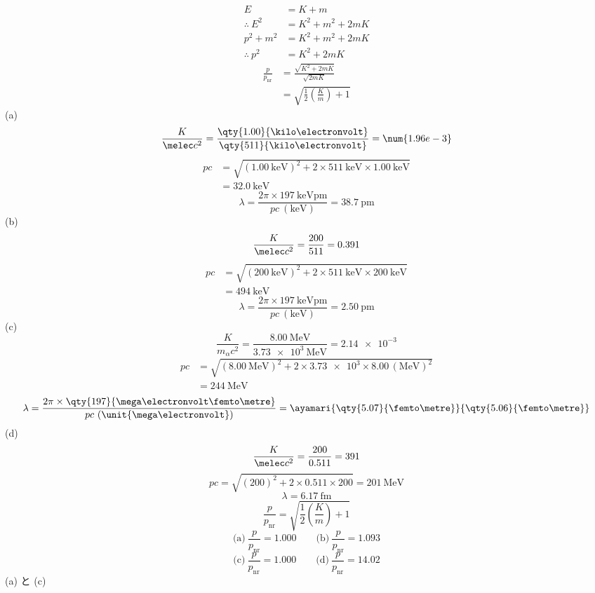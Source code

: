 \begin{align*}
  E&=K+m\\
  \therefore\ E^{2}&=K^{2}+m^{2}+2mK\\
  p^{2}+m^{2}&=K^{2}+m^{2}+2mK\\
  \therefore\ p^{2}&=K^{2}+2mK
\end{align*}
\begin{align*}
  \frac{p}{p_{\mathrm{nr}}}&=\frac{\sqrt{K^{2}+2mK}}{\sqrt{2mK}}\\
  &=\sqrt{\frac{1}{2}\left(\frac{K}{m}\right)+1}
\end{align*}
(a)
\[ \frac{K}{\melec c^{2}}=\frac{\qty{1.00}{\kilo\electronvolt}}{\qty{511}{\kilo\electronvolt}}=\num{1.96e-3} \]
\begin{align*}
  pc&=\sqrt{(\qty{1.00}{\kilo\electronvolt})^{2}+2\times\qty{511}{\kilo\electronvolt}\times\qty{1.00}{\kilo\electronvolt}}\\
  &=\qty{32.0}{\kilo\electronvolt}
\end{align*}
\[ \lambda=\frac{2\pi\times\qty{197}{\kilo\electronvolt\pico\metre}}{pc\ (\unit{\kilo\electronvolt})}=\qty{38.7}{\pico\metre} \]
(b)
\[ \frac{K}{\melec c^{2}}=\frac{200}{511}=0.391 \]
\begin{align*}
  pc&=\sqrt{(\qty{200}{\kilo\electronvolt})^{2}+2\times\qty{511}{\kilo\electronvolt}\times\qty{200}{\kilo\electronvolt}}\\
  &=\qty{494}{\kilo\electronvolt}
\end{align*}
\[ \lambda=\frac{2\pi\times\qty{197}{\kilo\electronvolt\pico\metre}}{pc\ (\unit{\kilo\electronvolt})}=\qty{2.50}{\pico\metre} \]
(c)
\[ \frac{K}{m_{\alpha}c^{2}}=\frac{\qty{8.00}{\mega\electronvolt}}{\qty{3.73e3}{\mega\electronvolt}}=\num{2.14e-3} \]
\begin{align*}
  pc&=\sqrt{(\qty{8.00}{\mega\electronvolt})^{2}+2\times\num{3.73e3}\times8.00\,(\unit{\mega\electronvolt})^{2}}\\
  &=\qty{244}{\mega\electronvolt}
\end{align*}
\[ \lambda=\frac{2\pi\times\qty{197}{\mega\electronvolt\femto\metre}}{pc\ (\unit{\mega\electronvolt})}=\ayamari{\qty{5.07}{\femto\metre}}{\qty{5.06}{\femto\metre}} \]
(d)
\[ \frac{K}{\melec c^{2}}=\frac{200}{0.511}=391 \]
\[ pc=\sqrt{(200)^{2}+2\times0.511\times200}=\qty{201}{\mega\electronvolt} \]
\[ \lambda=\qty{6.17}{\femto\metre} \]
\[ \frac{p}{p_{\mathrm{nr}}}=\sqrt{\frac{1}{2}\left(\frac{K}{m}\right)+1} \]
\[ \text{(a)}\ \frac{p}{p_{\mathrm{nr}}}=1.000\qquad\text{(b)}\ \frac{p}{p_{\mathrm{nr}}}=1.093 \]
\[ \text{(c)}\ \frac{p}{p_{\mathrm{nr}}}=1.000\qquad\text{(d)}\ \frac{p}{p_{\mathrm{nr}}}=14.02 \]
(a) と (c)

